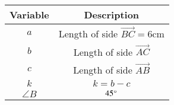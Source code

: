 \begin{tabular}[15pt]{ |c| c|}
    \hline
    \textbf{Variable} & \textbf{Description}\\ 
    \hline
	$a$ & Length of side $\vec{BC}=6$cm \\
    \hline 
	$b$ & Length of side $\vec{AC}$ \\
	\hline
	$c$ & Length of side $\vec{AB}$ \\
    \hline
	$k$ & $k=b-c$ \\
	\hline
	$\angle B$ & $45\degree$\\
	\hline
    \end{tabular}
